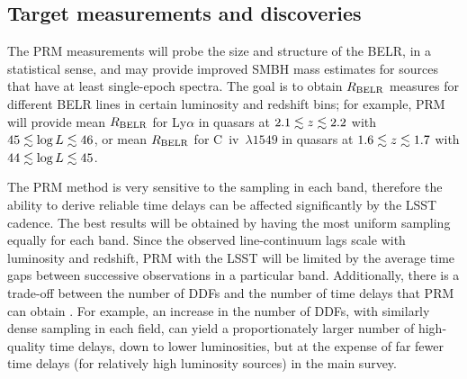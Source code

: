 
\subsection{Target measurements and discoveries}
\label{sec:\secname:targets}



The PRM measurements will probe the size and structure of the
BELR, in a statistical sense, and may provide improved SMBH mass estimates
for sources that have at least single-epoch spectra. The goal is
to obtain $R_{\rm BELR}$ measures for different BELR lines in certain
luminosity and redshift bins; for example, PRM will provide mean $R_{\rm BELR}$
for Ly$\alpha$ in quasars at $2.1\lesssim z \lesssim 2.2$ with $45 \lesssim \log L \lesssim 46$,
or mean $R_{\rm BELR}$ for C~{\sc iv}~$\lambda 1549$ in quasars at $1.6\lesssim z \lesssim 1.7$
with $44 \lesssim \log L \lesssim 45$.

The PRM method is very sensitive to the sampling in each band,
therefore the ability to derive reliable time delays can be affected
significantly by the LSST cadence. The best results will be obtained
by having the most uniform sampling equally for each band.
%
Since the observed line-continuum lags scale with luminosity and redshift,
PRM with the LSST will be limited by the average time gaps between successive
observations in a particular band.
%
Additionally, there is a trade-off between the number of DDFs and the
number of time delays that PRM can obtain \citep{CheloucheEtal2014}.
For example, an increase in the number of DDFs, with similarly dense
sampling in each field, can yield a proportionately larger number of
high-quality time delays, down to lower luminosities, but at the
expense of far fewer time delays (for relatively high luminosity
sources) in the main survey.

